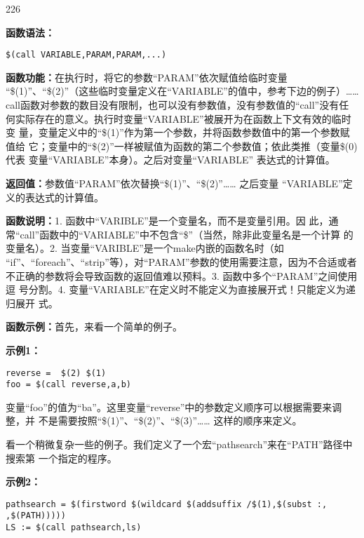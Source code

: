 \begin{dinglist}{226}
\itemsep=4pt \parskip=0pt

\item \textbf{函数语法：}

\begin{Verbatim}[]
$(call VARIABLE,PARAM,PARAM,...)
\end{Verbatim}

\item \textbf{函数功能：}在执行时，将它的参数“PARAM”依次赋值给临时变量
    “\$(1)”、“\$(2)”（这些临时变量定义在“VARIABLE”的值中，参考下边的例子）……
    call函数对参数的数目没有限制，也可以没有参数值，没有参数值的“call”没有任
    何实际存在的意义。执行时变量“VARIABLE”被展开为在函数上下文有效的临时变
    量，变量定义中的“\$(1)”作为第一个参数，并将函数参数值中的第一个参数赋值给
    它；变量中的“\$(2)”一样被赋值为函数的第二个参数值；依此类推（变量\$(0)代表
    变量“VARIABLE”本身）。之后对变量“VARIABLE” 表达式的计算值。


\item \textbf{返回值：}参数值“PARAM”依次替换“\$(1)”、“\$(2)”…… 之后变量
    “VARIABLE”定义的表达式的计算值。

\item \textbf{函数说明：}1. 函数中“VARIBLE”是一个变量名，而不是变量引用。因
    此，通常“call”函数中的“VARIABLE”中不包含“\$”（当然，除非此变量名是一个计算
    的变量名）。2. 当变量“VARIBLE”是一个make内嵌的函数名时（如
    “if”、“foreach”、“strip”等），对“PARAM”参数的使用需要注意，因为不合适或者
    不正确的参数将会导致函数的返回值难以预料。3. 函数中多个“PARAM”之间使用逗
    号分割。4. 变量“VARIABLE”在定义时不能定义为直接展开式！只能定义为递归展开
    式。

\item \textbf{函数示例：}首先，来看一个简单的例子。
\end{dinglist}
\textbf{示例1：}

\begin{Verbatim}[]
reverse =  $(2) $(1)
foo = $(call reverse,a,b)
\end{Verbatim}

变量“foo”的值为“ba”。这里变量“reverse”中的参数定义顺序可以根据需要来调整，并
不是需要按照“\$(1)”、“\$(2)”、“\$(3)”…… 这样的顺序来定义。

看一个稍微复杂一些的例子。我们定义了一个宏“pathsearch”来在“PATH”路径中搜索第
一个指定的程序。

\textbf{示例2：}

\begin{Verbatim}[]
pathsearch = $(firstword $(wildcard $(addsuffix /$(1),$(subst :, ,$(PATH)))))
LS := $(call pathsearch,ls)
\end{Verbatim}

